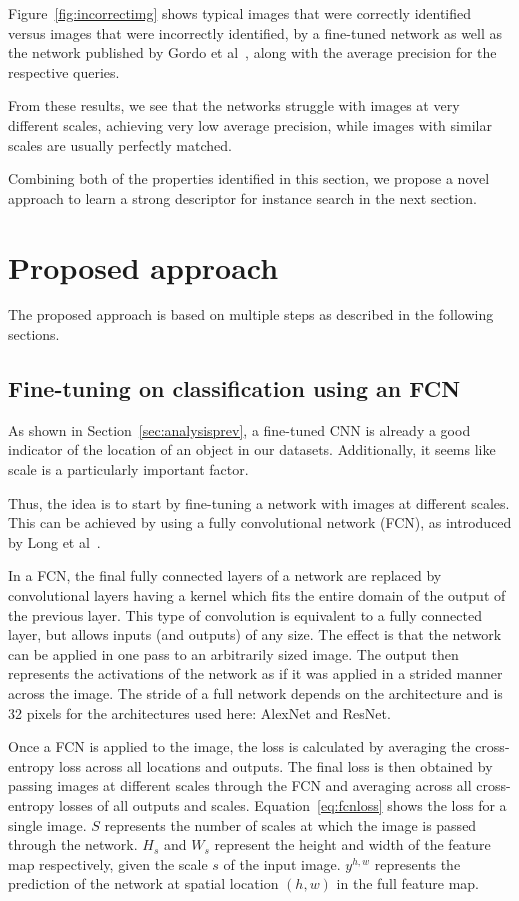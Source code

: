 Figure~\ref{fig:incorrectimg}
shows typical images that were correctly identified versus images that
were incorrectly identified, by a fine-tuned network as well as the network
published by Gordo et al~\cite{gordo_deep_2016}, along with the average
precision for the respective queries.

From these results, we see that the networks struggle with images at
very different scales, achieving very low average precision,
while images with similar scales are usually perfectly matched.

Combining both of the properties identified in this section, we
propose a novel approach to learn a strong descriptor for instance
search in the next section.

\section{Proposed approach}
The proposed approach is based on multiple steps as described in the
following sections.

\subsection{Fine-tuning on classification using an FCN}\label{sec:fcnfinetune}
As shown in Section~\ref{sec:analysisprev}, a fine-tuned CNN is already
a good indicator of the location of an object in our datasets.
Additionally, it seems like scale is a particularly important factor.

Thus, the idea is to start by fine-tuning a network with images
at different scales. This can be achieved by using a fully
convolutional network (FCN), as introduced by
Long et al~\cite{long_fully_2015}.

In a FCN, the final fully connected layers
of a network are replaced by convolutional layers having a kernel
which fits the entire domain of the output of the previous layer.
This type of convolution is equivalent to a fully connected layer,
but allows inputs (and outputs) of any size.
The effect is that the network can be applied in one pass to an
arbitrarily sized image. The output then represents the activations
of the network as if it was applied in a strided manner across the image.
The stride of a full network depends on the architecture and is 32
pixels for the architectures used here: AlexNet and ResNet.

Once a FCN is applied to the image, the loss
is calculated by averaging the cross-entropy loss across all locations
and outputs.
The final loss is then obtained by passing images at different scales
through the FCN and averaging across all cross-entropy losses of all
outputs and scales. Equation~\ref{eq:fcnloss} shows the loss for a
single image. $S$ represents the number of scales at which the image
is passed through the network.
$H_s$ and $W_s$ represent the height and width of the feature
map respectively, given the scale $s$ of the input image. $y^{h,w}$
represents the prediction of the network at spatial location
$(h,w)$ in the full feature map.


